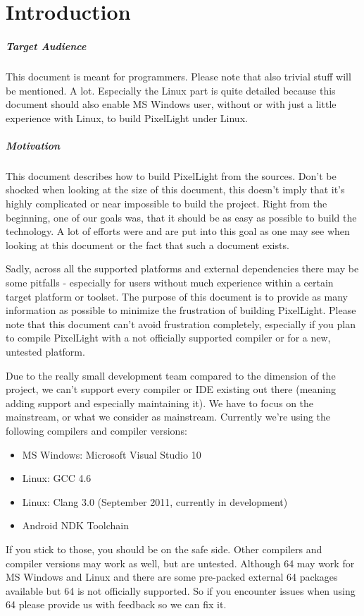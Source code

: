 \chapter{Introduction}


\paragraph{Target Audience}
This document is meant for programmers. Please note that also trivial stuff will be mentioned. A lot. Especially the Linux part is quite detailed because this document should also enable MS Windows user, without or with just a little experience with Linux, to build PixelLight under Linux.


\paragraph{Motivation}
This document describes how to build PixelLight from the sources. Don't be shocked when looking at the size of this document, this doesn't imply that it's highly complicated or near impossible to build the project. Right from the beginning, one of our goals was, that it should be as easy as possible to build the technology. A lot of efforts were and are put into this goal as one may see when looking at this document or the fact that such a document exists.

Sadly, across all the supported platforms and external dependencies there may be some pitfalls - especially for users without much experience within a certain target platform or toolset. The purpose of this document is to provide as many information as possible to minimize the frustration of building PixelLight. Please note that this document can't avoid frustration completely, especially if you plan to compile PixelLight with a not officially supported compiler or for a new, untested platform.

Due to the really small development team compared to the dimension of the project, we can't support every compiler or IDE existing out there (meaning adding support and especially maintaining it). We have to focus on the mainstream, or what we consider as mainstream. Currently we're using the following compilers and compiler versions:
\begin{itemize}
\item{MS Windows: Microsoft Visual Studio 10}
\item{Linux: \ac{GCC} 4.6}
\item{Linux: Clang 3.0 (September 2011, currently in development)}
\item{Android \ac{NDK} Toolchain}
\end{itemize}
If you stick to those, you should be on the safe side. Other compilers and compiler versions may work as well, but are untested. Although \SI{64}{\bit} may work for MS Windows and Linux and there are some pre-packed external \SI{64}{\bit} packages available but \SI{64}{\bit} is not officially supported. So if you encounter issues when using \SI{64}{\bit} please provide us with feedback so we can fix it.

